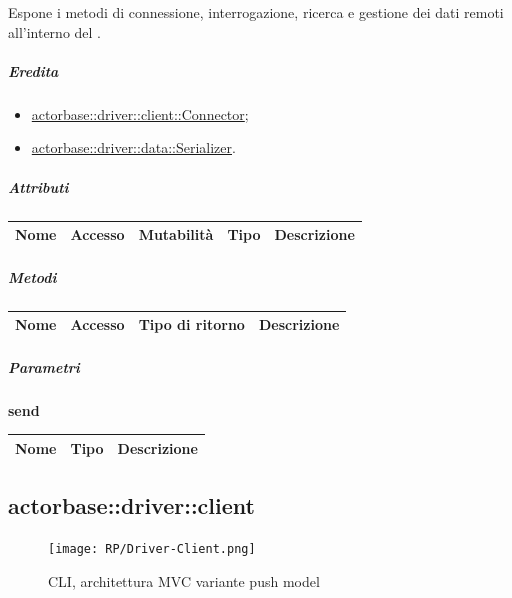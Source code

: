 \documentclass{scalatekids-article}
\begin{document}
Espone i metodi di connessione, interrogazione, ricerca e gestione dei dati
remoti all'interno del .

\subparagraph{Eredita}

\begin{itemize}
\item \hyperref[sec:actorbase::driver::client::Connector]{actorbase::driver::client::Connector};
\item \hyperref[sec:actorbase::driver::client::Connector]{actorbase::driver::data::Serializer}.
\end{itemize}

\subparagraph{Attributi}


\begin{tabular}{| p{3cm} | p{1.5cm} | p{2cm} | p{2cm} | p{8.5cm} |}
  \hline
  Nome & Accesso & Mutabilità & Tipo & Descrizione\\
  \hline
\end{tabular}

\subparagraph{Metodi}


\begin{tabular}{| l | l | l | l |}
  \hline
  Nome & Accesso & Tipo di ritorno & Descrizione\\
  \hline
\end{tabular}

\subparagraph{Parametri}


\begin{center}
  \textbf{send}
\end{center}
\begin{tabular}{| l | l | l |}
  \hline
  Nome & Tipo & Descrizione\\
  \hline
\end{tabular}


\subsection{actorbase::driver::client}
\label{sec:actorbase::driver::client}

\begin{figure}[H]
  \begin{center}
    \texttt{[image: RP/Driver-Client.png]}
    \caption{CLI, architettura MVC variante push model}
  \end{center}
\end{figure}
\end{document}
